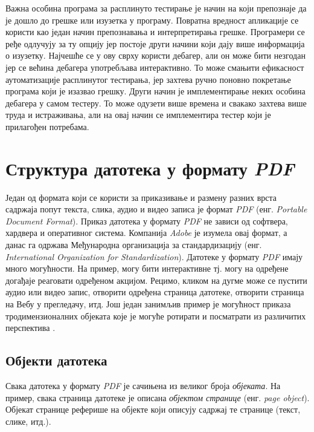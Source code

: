 \documentclass[12pt,oneside]{memoir}
\begin{document}
Важна особина програма за расплинуто тестирање је начин на који препознаје да је дошло до грешке или изузетка у програму. Повратна вредност апликације се користи као један начин препознавања и  интерпретирања грешке. Програмери се ређе одлучују за ту опцију јер постоје други начини који дају више информација о изузетку. Најчешће се у ову сврху користи дебагер, али он може бити незгодан јер се већина дебагера употребљава интерактивно. То може смањити ефикасност аутоматизације расплинутог тестирања, јер захтева ручно поновно покретање програма који је изазвао грешку. Други начин је имплементирање неких особина дебагера у самом тестеру. То може одузети више времена и свакако захтева више труда и истраживања, али на овај начин се имплементира тестер који је прилагођен потребама.

\chapter{Структура датотека у формату \textit{PDF}}
\label{chp:pdfStruktura}

Један од формата који се користи за приказивање и размену разних врста садржаја попут текста, слика, аудио и видео записа је формат \textit{PDF} (енг. \textit{Portable Document Format}). Приказ датотека у формату \textit{PDF} не зависи од софтвера, хардвера и оперативног система. Компанија \textit{Adobe} је изумела овај формат, а данас га одржава Међународна организација за стандардизацију (енг. \textit{International Organization for Standardization}). Датотеке у формату \textit{PDF} имају много могућности. На пример, могу бити интерактивне тј. могу на одређене догађаје реаговати одређеном акцијом. Рецимо, кликом на дугме може се пустити аудио или видео запис, отворити одређена страница  датотеке, отворити страница на Вебу у прегледачу, итд. Још један занимљив пример је могућност приказа  тродимензионалних објеката које је могуће ротирати и посматрати из различитих перспектива \cite{adobePdf1, adobePdf2}.

\section{Објекти датотека}
\label{sec:objektiPDF}

Свака датотека у формату \textit{PDF} је сачињена из великог броја \textit{објеката}. На пример, свака страница датотеке је описана \textit{објектом странице} (енг. \textit{page object}). Објекат странице реферише на објекте који описују садржај те странице (текст, слике, итд.).
\end{document}
